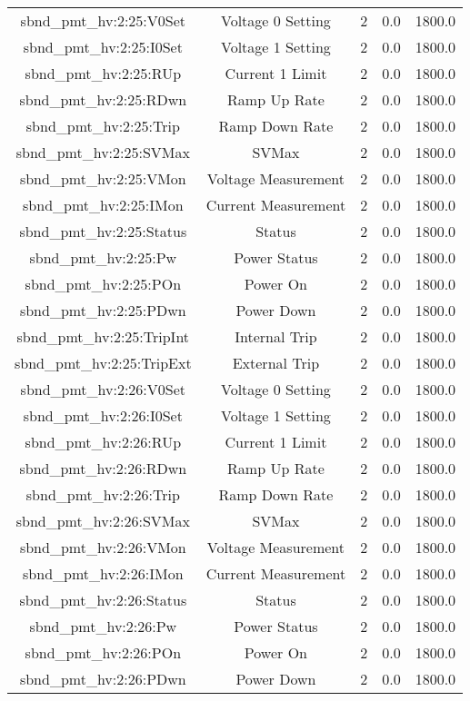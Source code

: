 \begin{center}
\begin{longtable}{c | c c c c }
sbnd\_pmt\_hv:2:25:V0Set & Voltage 0 Setting & 2 & 0.0 & 1800.0\\ 
sbnd\_pmt\_hv:2:25:I0Set & Voltage 1 Setting & 2 & 0.0 & 1800.0\\ 
sbnd\_pmt\_hv:2:25:RUp & Current 1 Limit & 2 & 0.0 & 1800.0\\ 
sbnd\_pmt\_hv:2:25:RDwn & Ramp Up Rate & 2 & 0.0 & 1800.0\\ 
sbnd\_pmt\_hv:2:25:Trip & Ramp Down Rate & 2 & 0.0 & 1800.0\\ 
sbnd\_pmt\_hv:2:25:SVMax & SVMax & 2 & 0.0 & 1800.0\\ 
sbnd\_pmt\_hv:2:25:VMon & Voltage Measurement & 2 & 0.0 & 1800.0\\ 
sbnd\_pmt\_hv:2:25:IMon & Current Measurement & 2 & 0.0 & 1800.0\\ 
sbnd\_pmt\_hv:2:25:Status & Status & 2 & 0.0 & 1800.0\\ 
sbnd\_pmt\_hv:2:25:Pw & Power Status & 2 & 0.0 & 1800.0\\ 
sbnd\_pmt\_hv:2:25:POn & Power On & 2 & 0.0 & 1800.0\\ 
sbnd\_pmt\_hv:2:25:PDwn & Power Down & 2 & 0.0 & 1800.0\\ 
sbnd\_pmt\_hv:2:25:TripInt & Internal Trip & 2 & 0.0 & 1800.0\\ 
sbnd\_pmt\_hv:2:25:TripExt & External Trip & 2 & 0.0 & 1800.0\\ 
sbnd\_pmt\_hv:2:26:V0Set & Voltage 0 Setting & 2 & 0.0 & 1800.0\\ 
sbnd\_pmt\_hv:2:26:I0Set & Voltage 1 Setting & 2 & 0.0 & 1800.0\\ 
sbnd\_pmt\_hv:2:26:RUp & Current 1 Limit & 2 & 0.0 & 1800.0\\ 
sbnd\_pmt\_hv:2:26:RDwn & Ramp Up Rate & 2 & 0.0 & 1800.0\\ 
sbnd\_pmt\_hv:2:26:Trip & Ramp Down Rate & 2 & 0.0 & 1800.0\\ 
sbnd\_pmt\_hv:2:26:SVMax & SVMax & 2 & 0.0 & 1800.0\\ 
sbnd\_pmt\_hv:2:26:VMon & Voltage Measurement & 2 & 0.0 & 1800.0\\ 
sbnd\_pmt\_hv:2:26:IMon & Current Measurement & 2 & 0.0 & 1800.0\\ 
sbnd\_pmt\_hv:2:26:Status & Status & 2 & 0.0 & 1800.0\\ 
sbnd\_pmt\_hv:2:26:Pw & Power Status & 2 & 0.0 & 1800.0\\ 
sbnd\_pmt\_hv:2:26:POn & Power On & 2 & 0.0 & 1800.0\\ 
sbnd\_pmt\_hv:2:26:PDwn & Power Down & 2 & 0.0 & 1800.0\\ 

\end{longtable}
\end{center}
